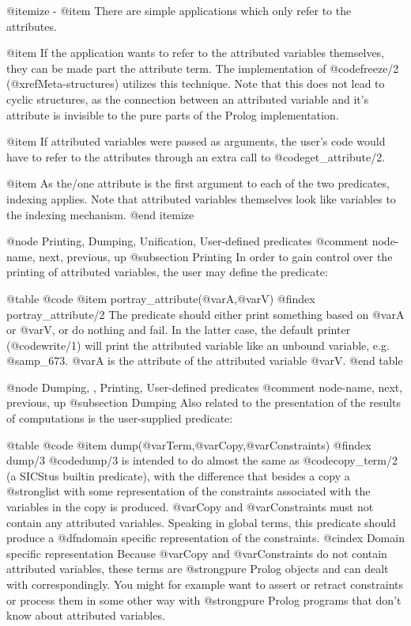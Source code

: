 @itemize -
@item 
There are simple applications which only refer to the attributes.

@item 
If the application wants to refer to the attributed variables
themselves, they can be made part the attribute term.  The
implementation of @code{freeze/2} (@xref{Meta-structures}) utilizes this
technique.  Note that this does not lead to cyclic structures, as the
connection between an attributed variable and it's attribute is
invisible to the pure parts of the Prolog implementation.
    
@item 
If attributed variables were passed as arguments, the user's code would
have to refer to the attributes through an extra call to
@code{get_attribute/2}.

@item 
As the/one attribute is the first argument to each of the two
predicates, indexing applies. Note that attributed variables themselves
look like variables to the indexing mechanism.
@end itemize

@node Printing, Dumping, Unification, User-defined predicates    
@comment  node-name,  next,  previous,  up
@subsection Printing
In order to gain control over the printing of attributed variables, the
user may define the predicate:

@table @code
@item portray_attribute(@var{A},@var{V})
@findex portray_attribute/2
The predicate should either print something based on @var{A} or @var{V},
or do nothing and fail. In the latter case, the default printer
(@code{write/1}) will print the attributed variable like an unbound
variable, e.g. @samp{_673}.  @var{A} is the attribute of the attributed
variable @var{V}.
@end table

@node Dumping, , Printing, User-defined predicates    
@comment  node-name,  next,  previous,  up
@subsection Dumping
Also related to the presentation of the results of computations is the 
user-supplied predicate:

@table @code
@item dump(@var{Term},@var{Copy},@var{Constraints})
@findex dump/3
@code{dump/3} is intended to do almost the same as @code{copy_term/2} (a
SICStus builtin predicate), with the difference that besides a copy a
@strong{list} with some representation of the constraints associated
with the variables in the copy is produced. @var{Copy} and
@var{Constraints} must not contain any attributed variables. Speaking in
global terms, this predicate should produce a @dfn{domain specific
representation} of the constraints.
@cindex Domain specific representation
Because @var{Copy} and @var{Constraints} do not contain attributed
variables, these terms are @strong{pure} Prolog objects and can dealt
with correspondingly. You might for example want to assert or retract
constraints or process them in some other way with @strong{pure} Prolog
programs that don't know about attributed variables.

